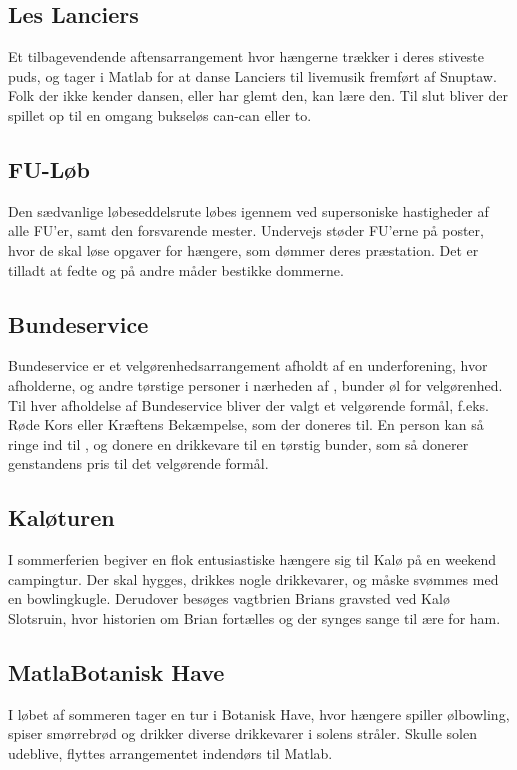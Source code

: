\subsection{Les Lanciers}
Et tilbagevendende aftensarrangement hvor hængerne trækker i deres stiveste puds, og tager i Matlab for at danse Lanciers til livemusik fremført af Snuptaw. Folk der ikke kender dansen, eller har glemt den, kan lære den. Til slut bliver der spillet op til en omgang bukseløs can-can eller to.

\subsection{FU-Løb}
Den sædvanlige løbeseddelsrute løbes igennem ved supersoniske hastigheder af alle FU'er, samt den forsvarende mester. Undervejs støder FU'erne på poster, hvor de skal løse opgaver for hængere, som dømmer deres præstation. Det er tilladt at fedte og på andre måder bestikke dommerne.

\subsection{Bundeservice}
Bundeservice er et velgørenhedsarrangement afholdt af en underforening, hvor afholderne, og andre tørstige personer i nærheden af \TKET, bunder øl for velgørenhed. Til hver afholdelse af Bundeservice bliver der valgt et velgørende formål, f.eks. Røde Kors eller Kræftens Bekæmpelse, som der doneres til. En person kan så ringe ind til \TKET{}, og donere en drikkevare til en tørstig bunder, som så donerer genstandens pris til det velgørende formål. 

\subsection{Kaløturen}
I sommerferien begiver en flok entusiastiske hængere sig til Kalø på en weekend campingtur. Der skal hygges, drikkes nogle drikkevarer, og måske svømmes med en bowlingkugle. Derudover besøges vagtbrien Brians gravsted ved Kalø Slotsruin, hvor historien om Brian fortælles og der synges sange til ære for ham.

\subsection{MatlaBotanisk Have}
I løbet af sommeren tager \TKET en tur i Botanisk Have, hvor hængere spiller ølbowling, spiser smørrebrød og drikker diverse drikkevarer i solens stråler. Skulle solen udeblive, flyttes arrangementet indendørs til Matlab.

